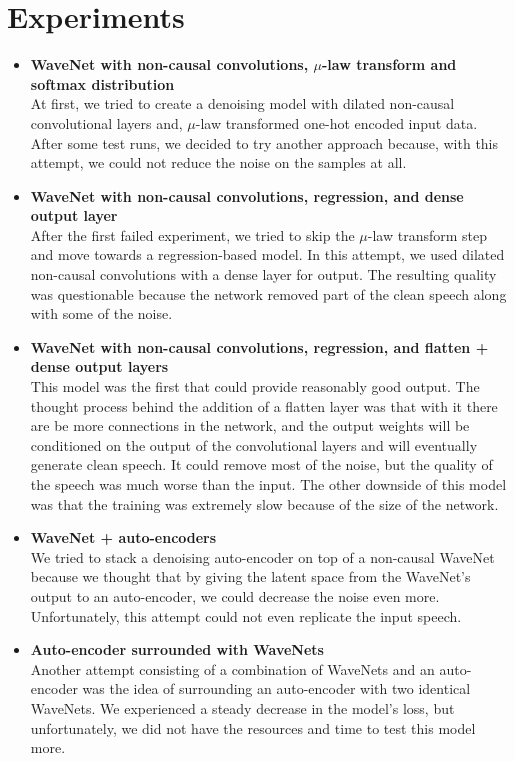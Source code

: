 \documentclass{article}
\begin{document}
	\section{Experiments}
	\label{sec:experiments}
	\begin{itemize}
	\item \textbf{WaveNet with non-causal convolutions, \boldmath$\mu$-law transform and softmax distribution} \\
	At first, we tried to create a denoising model with dilated non-causal convolutional layers and, $\mu$-law transformed one-hot encoded input data. After some test runs, we decided to try another approach because, with this attempt, we could not reduce the noise on the samples at all.
	\item \textbf{WaveNet with non-causal convolutions, regression, and dense output layer} \\
	After the first failed experiment, we tried to skip the $\mu$-law transform step and move towards a regression-based model. In this attempt, we used dilated non-causal convolutions with a dense layer for output. The resulting quality was questionable because the network removed part of the clean speech along with some of the noise.
	\item \textbf{WaveNet with non-causal convolutions, regression, and flatten + dense output layers} \\
	This model was the first that could provide reasonably good output. The thought process behind the addition of a flatten layer was that with it there are be more connections in the network, and the output weights will be conditioned on the output of the convolutional layers and will eventually generate clean speech. It could remove most of the noise, but the quality of the speech was much worse than the input. The other downside of this model was that the training was extremely slow because of the size of the network.
	\item \textbf{WaveNet + auto-encoders} \\
	We tried to stack a denoising auto-encoder on top of a non-causal WaveNet because we thought that by giving the latent space from the WaveNet's output to an auto-encoder, we could decrease the noise even more. Unfortunately, this attempt could not even replicate the input speech.
	\item \textbf {Auto-encoder surrounded with WaveNets} \\
	Another attempt consisting of a combination of WaveNets and an auto-encoder was the idea of surrounding an auto-encoder with two identical WaveNets. We experienced a steady decrease in the model's loss, but unfortunately, we did not have the resources and time to test this model more.

\end{itemize}
\end{document}
